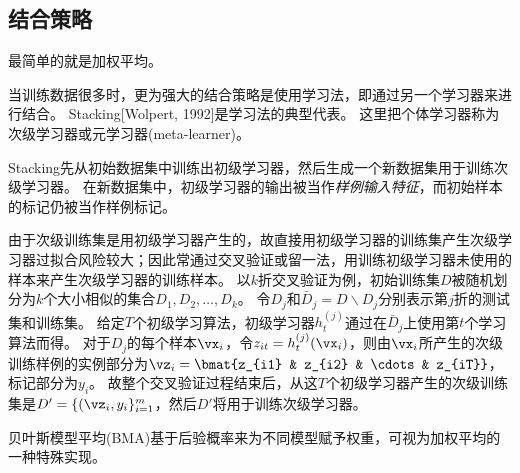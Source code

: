 \subsection{结合策略}
最简单的就是加权平均。

当训练数据很多时，更为强大的结合策略是使用学习法，即通过另一个学习器来进行结合。
Stacking[Wolpert, 1992]是学习法的典型代表。
这里把个体学习器称为次级学习器或元学习器(meta-learner)。

Stacking先从初始数据集中训练出初级学习器，然后生成一个新数据集用于训练次级学习器。
在新数据集中，初级学习器的输出被当作\emph{样例输入特征}，而初始样本的标记仍被当作样例标记。

由于次级训练集是用初级学习器产生的，故直接用初级学习器的训练集产生次级学习器过拟合风险较大；因此常通过交叉验证或留一法，用训练初级学习器未使用的样本来产生次级学习器的训练样本。
以$k$折交叉验证为例，初始训练集$D$被随机划分为$k$个大小相似的集合$D_1,D_2,\ldots,D_k$。
令$D_j$和$\bar{D}_j=D\backslash D_j$分别表示第$j$折的测试集和训练集。
给定$T$个初级学习算法，初级学习器$h_t^{(j)}$通过在$\bar{D}_j$上使用第$t$个学习算法而得。
对于$D_j$的每个样本$\vx_i$，令$z_{it}=h_t^{(j)}(\vx_i)$，则由$\vx_i$所产生的次级训练样例的实例部分为$\vz_i=\bmat{z_{i1} & z_{i2} & \cdots & z_{iT}}$，标记部分为$y_i$。
故整个交叉验证过程结束后，从这$T$个初级学习器产生的次级训练集是$D'=\{(\vz_i,y_i\}_{i=1}^m$，然后$D'$将用于训练次级学习器。

贝叶斯模型平均(BMA)基于后验概率来为不同模型赋予权重，可视为加权平均的一种特殊实现。